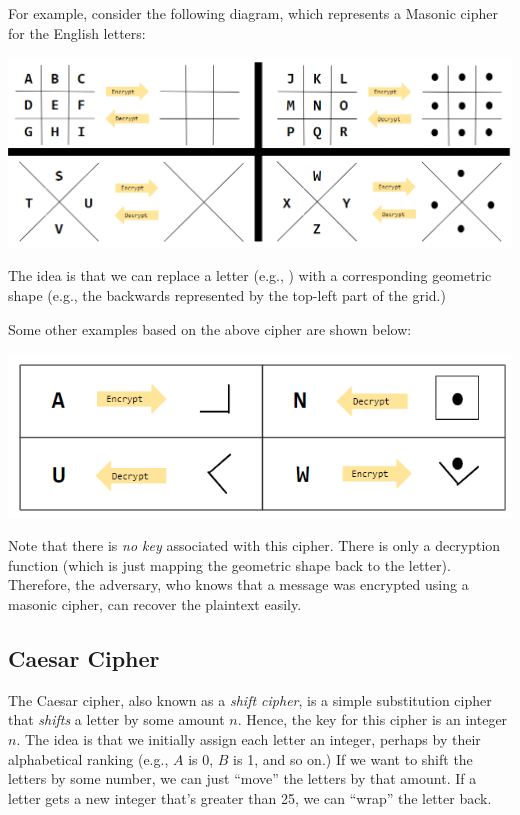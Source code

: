 \documentclass[letterpaper]{article}
\begin{document}
For example, consider the following diagram, which represents a Masonic cipher for the English letters:
\begin{center}
    \includegraphics[scale=0.75]{../assets/masonic_ex1.png}
\end{center}
The idea is that we can replace a letter (e.g., ) with a corresponding geometric shape (e.g., the backwards  represented by the top-left part of the grid.) 

\bigskip 

Some other examples based on the above cipher are shown below:
\begin{center}
    \includegraphics[scale=0.9]{../assets/masonic_ex2.png}
\end{center}
Note that there is \emph{no key} associated with this cipher. There is only a decryption function (which is just mapping the geometric shape back to the letter). Therefore, the adversary, who knows that a message was encrypted using a masonic cipher, can recover the plaintext easily. 


\subsection{Caesar Cipher}
The Caesar cipher, also known as a \emph{shift cipher}, is a simple substitution cipher that \emph{shifts} a letter by some amount $n$. Hence, the key for this cipher is an integer $n$. The idea is that we initially assign each letter an integer, perhaps by their alphabetical ranking (e.g., $A$ is 0, $B$ is 1, and so on.) If we want to shift the letters by some number, we can just ``move'' the letters by that amount. If a letter gets a new integer that's greater than 25, we can ``wrap'' the letter back.  
\end{document}
